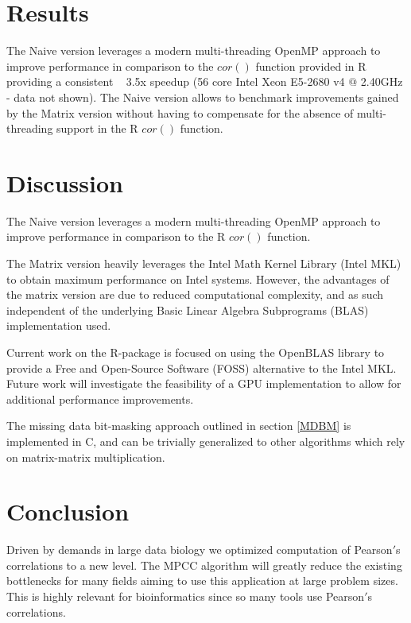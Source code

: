 \documentclass{bioinfo}
\begin{document}
\section{Results}
The Naive version leverages a modern multi-threading OpenMP approach 
to improve performance in comparison to the $cor()$ function provided 
in R providing a consistent ~ 3.5x speedup (56 core Intel Xeon E5-2680 
v4 $@$ 2.40GHz - data not shown). The Naive version allows to 
benchmark improvements gained by the Matrix version without having to 
compensate for the absence of multi-threading support in the R 
$cor()$ function.

\vspace*{-6pt}

\section{Discussion}
The Naive version leverages a modern multi-threading OpenMP approach 
to improve performance in comparison to the R $cor()$ function.

The Matrix version heavily leverages the Intel\textregistered{} Math Kernel 
Library (Intel\textregistered{} MKL) to obtain maximum performance 
on Intel\textregistered{} systems. However, the advantages of the 
matrix version are due to reduced computational complexity, and as 
such independent of the underlying Basic Linear Algebra Subprograms 
(BLAS) implementation used.

Current work on the R-package is focused on using the OpenBLAS 
library to provide a Free and Open-Source Software (FOSS) 
alternative to the Intel\textregistered{} MKL. Future work will 
investigate the feasibility of a GPU implementation to allow 
for additional performance improvements.

The missing data bit-masking approach outlined in section \ref{MDBM} 
is implemented in C, and can be trivially generalized to other 
algorithms which rely on matrix-matrix multiplication. \vspace*{-12pt}

\section{Conclusion}

Driven by demands in large data biology we optimized computation of Pearson$'$s 
correlations to a new level. The MPCC algorithm will greatly reduce the 
existing bottlenecks for many fields aiming to use this application at large 
problem sizes. This is highly relevant for bioinformatics since so many 
tools use Pearson$'$s correlations. 
\end{document}
